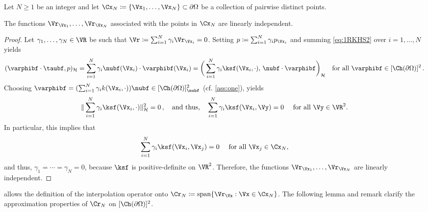 \documentclass{siamart1116}
\numberwithin{theorem}{section}
\begin{document}
Let $N\ge 1$ be an integer and let $\Cx_N \coloneqq \{\Vx_1,\ldots, \Vx_N \}\subset \partial \Omega$
be a collection of pairwise distinct points.
\begin{lemma}\label{lem:linearindepenent}
The functions $\Vr_{\Vx_1},\ldots, \Vr_{\Vx_N}$ associated with the points in $\Cx_N$
are linearly independent.
\end{lemma}
\begin{proof}
Let $\gamma_1,\ldots, \gamma_N\in \VR$ be such that
$\Vr\coloneqq \sum_{i=1}^N \gamma_i \Vr_{\Vx_i} = 0$.
Setting $p \coloneqq \sum_{i=1}^N \gamma_i p_{\Vx_i}$
and summing \cref{eq:1RKHS2} over $i=1,\ldots, N$ yields
\begin{equation}\label{eq:p_var}
(\varphibf\cdot \taubf,p)_{\mathcal H} = \sum_{i=1}^N \gamma_i\nubf(\Vx_i)\cdot \varphibf(\Vx_i) = \bigg(\sum_{i=1}^N \gamma_i \ksf(\Vx_i,\cdot),\, \nubf\cdot \varphibf\bigg)_{\mathcal H}
\quad \text{for all }\varphibf\in [\Ch(\partial \Omega)]^2\,.
\end{equation} 
Choosing
$\varphibf = (\sum_{i=1}^N \gamma_i k(\Vx_i,\cdot))\nubf \in[\Ch(\partial \Omega)]_{\nubf}^2$
(cf. \cref{ass:one}), yields
\begin{equation}
\Vert\sum_{i=1}^N \gamma_i \ksf(\Vx_i,\cdot)\Vert_{\mathcal H}^2 = 0\,,
\quad\text{and thus,}\quad \sum_{i=1}^N \gamma_i \ksf(\Vx_i,\Vy) =0
\quad \text{ for all } \Vy\in \VR^2.
\end{equation}
In particular, this implies that
\begin{equation}
\sum_{i=1}^N \gamma_i \ksf(\Vx_i,\Vx_j) =0
\quad \text{ for all } \Vx_j \in \Cx_N,
\end{equation}
and thus, $\gamma_1=\cdots = \gamma_N=0$, because $\ksf$ is positive-definite on $\VR^2$.
Therefore, the functions
$\Vr_{\Vx_1},\ldots, \Vr_{\Vx_N}$	are linearly independent.
\end{proof}

 allows the definition of the interpolation operator onto
$\Cr_N\coloneqq\mathrm{span}\{\Vr_{\Vx}:\Vx\in\Cx_N\}$. The following lemma and remark
clarify the approximation properties of $\Cr_N$ on $[\Ch(\partial \Omega)]^2$.
\end{document}
